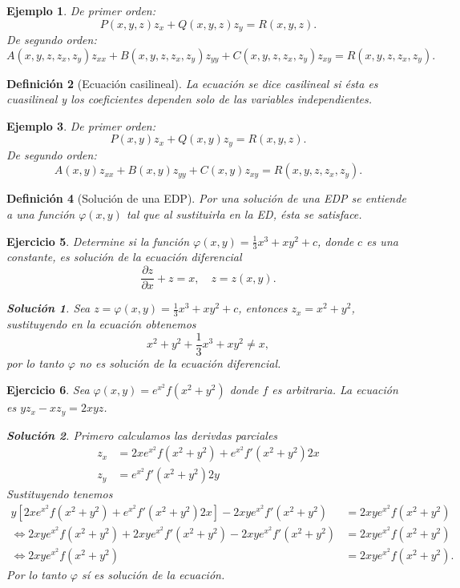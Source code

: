 \documentclass[11pt,letterpaper,draft]{report}
\newtheorem{defn}{Definición}[chapter]
\newtheorem{example}[defn]{Ejemplo}
\newtheorem{exe}[defn]{Ejercicio}
\newtheorem*{sol}{Solución}
\newcommand\<{\langle}
\renewcommand\>{\rangle}
\renewcommand\phi\varphi
\begin{document}
\begin{example}
  De primer orden:
  \[
    P(x,y,z)z_x + Q(x,y,z) z_y = R(x,y,z).
  \] 
  De segundo orden:
  \[
    A(x,y,z,z_x,z_y) z_{xx} + B(x,y,z,z_x,z_y) z_{yy} +
    C(x,y,z,z_x,z_y) z_{xy} = R(x,y,z,z_x,z_y).
  \] 
\end{example}

\begin{defn}[Ecuación casilineal]
  La ecuación se dice casilineal si ésta es cuasilineal y
  los coeficientes dependen solo de las variables
  independientes.
\end{defn}

\begin{example}
  De primer orden:
  \[
    P(x,y)z_x + Q(x,y) z_y = R(x,y,z).
  \] 
  De segundo orden:
  \[
    A(x,y) z_{xx} + B(x,y) z_{yy} +
    C(x,y) z_{xy} = R(x,y,z,z_x,z_y).
  \] 

\end{example}

\begin{defn}[Solución de una EDP]
  Por una solución de una EDP se entiende a una función
  $\phi(x,y)$ tal que al sustituirla en la ED, ésta se
  satisface.
\end{defn}

\begin{exe}
  Determine si la función $\displaystyle \phi(x,y) =
  \frac{1}{3}x^3 + xy^2 + c$, donde $c$ es una constante, es
  solución de la ecuación diferencial
  \[
    \frac{\partial z}{\partial x} + z = x, \quad z = z(x,y).
  \] 

  \begin{sol}
    Sea $z = \phi(x,y) = \frac{1}{3}x^3 + xy^2 + c$,
    entonces $z_x = x^2 + y^2$, sustituyendo en la ecuación
    obtenemos
    \[
    x^2 + y^2 + \frac{1}{3}x^3 + xy^2 \neq x,
    \] por lo tanto $\phi$ no es solución de la ecuación
    diferencial.
  \end{sol}
\end{exe}

\begin{exe}
  Sea $\phi(x,y) = e^{x^2}f(x^2+y^2)$ donde $f$ es
  arbitraria. La ecuación es $y z_x - x z_y = 2xyz$.
  
  \begin{sol}
    Primero calculamos las derivdas parciales
    \begin{align*}
      z_x &= 2x e^{x^2} f(x^2 + y^2) + e^{x^2} f'(x^2
      +y^2)2x\\
      z_y &= e^{x^2} f'(x^2+y^2)2y
    \end{align*} 
    Sustituyendo tenemos
    \begin{align*}
      y\left[2x e^{x^2} f(x^2+y^2) + e^{x^2} f'(x^2+y^2)
      2x\right] - 2xy e^{x^2} f'(x^2+y^2) &= 2xy e^{x^2}
      f(x^2+y^2)\\
      \iff 2xy e^{x^2} f(x^2+y^2) + 2xy e^{x^2} f'(x^2+y^2) - 2xy
      e^{x^2} f'(x^2+y^2) &= 2xy e^{x^2} f(x^2+y^2)\\
      \iff 2xy e^{x^2} f(x^2+y^2) &= 2xy e^{x^2} f(x^2+y^2).
    \end{align*} Por lo tanto $\phi$ sí es solución de la
    ecuación.
  \end{sol}
\end{exe}
\end{document}
